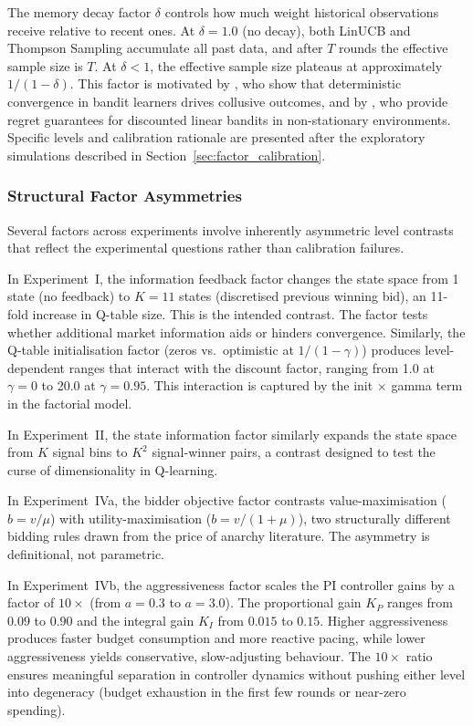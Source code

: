 The memory decay factor $\delta$ controls how much weight historical observations receive relative to recent ones. At $\delta = 1.0$ (no decay), both LinUCB and Thompson Sampling accumulate all past data, and after $T$ rounds the effective sample size is $T$. At $\delta < 1$, the effective sample size plateaus at approximately $1/(1-\delta)$. This factor is motivated by \citet{Douglas2024}, who show that deterministic convergence in bandit learners drives collusive outcomes, and by \citet{Russac2019}, who provide regret guarantees for discounted linear bandits in non-stationary environments. Specific levels and calibration rationale are presented after the exploratory simulations described in Section~\ref{sec:factor_calibration}.

\subsubsection{Structural Factor Asymmetries}

Several factors across experiments involve inherently asymmetric level contrasts that reflect the experimental questions rather than calibration failures.

In Experiment~I, the information feedback factor changes the state space from 1 state (no feedback) to $K = 11$ states (discretised previous winning bid), an 11-fold increase in Q-table size. This is the intended contrast. The factor tests whether additional market information aids or hinders convergence. Similarly, the Q-table initialisation factor (zeros vs.\ optimistic at $1/(1-\gamma)$) produces level-dependent ranges that interact with the discount factor, ranging from 1.0 at $\gamma = 0$ to 20.0 at $\gamma = 0.95$. This interaction is captured by the init $\times$ gamma term in the factorial model.

In Experiment~II, the state information factor similarly expands the state space from $K$ signal bins to $K^2$ signal-winner pairs, a contrast designed to test the curse of dimensionality in Q-learning.

In Experiment~IVa, the bidder objective factor contrasts value-maximisation ($b = v/\mu$) with utility-maximisation ($b = v/(1+\mu)$), two structurally different bidding rules drawn from the price of anarchy literature. The asymmetry is definitional, not parametric.

In Experiment~IVb, the aggressiveness factor scales the PI controller gains by a factor of $10\times$ (from $a = 0.3$ to $a = 3.0$). The proportional gain $K_P$ ranges from $0.09$ to $0.90$ and the integral gain $K_I$ from $0.015$ to $0.15$. Higher aggressiveness produces faster budget consumption and more reactive pacing, while lower aggressiveness yields conservative, slow-adjusting behaviour. The $10\times$ ratio ensures meaningful separation in controller dynamics without pushing either level into degeneracy (budget exhaustion in the first few rounds or near-zero spending).

